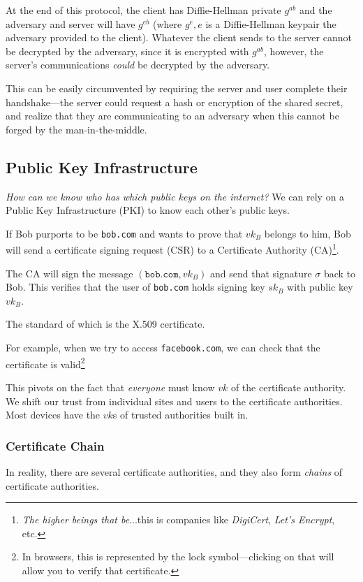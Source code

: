 At the end of this protocol, the client has Diffie-Hellman private $g^{ab}$ and the adversary and server will have $g^{eb}$ (where $g^e, e$ is a Diffie-Hellman keypair the adversary provided to the client). Whatever the client sends to the server cannot be decrypted by the adversary, since it is encrypted with $g^{ab}$, however, the server's communications \emph{could} be decrypted by the adversary.

This can be easily circumvented by requiring the server and user complete their handshake---the server could request a hash or encryption of the shared secret, and realize that they are communicating to an adversary when this cannot be forged by the man-in-the-middle.

\subsection{Public Key Infrastructure}

\emph{How can we know who has which public keys on the internet?} We can rely on a Public Key Infrastructure (PKI) to know each other's public keys.

If Bob purports to be \texttt{bob.com} and wants to prove that $vk_B$ belongs to him, Bob will send a certificate signing request (CSR) to a Certificate Authority (CA)\footnote{\emph{The higher beings that be}...this is companies like \emph{DigiCert}, \emph{Let's Encrypt}, etc.}.

The CA will sign the message $(\mathtt{bob.com}, vk_B)$ and send that signature $\sigma$ back to Bob. This verifies that the user of \texttt{bob.com} holds signing key $sk_B$ with public key $vk_B$.


The standard of which is the X.509 certificate.

For example, when we try to access \texttt{facebook.com}, we can check that the certificate is valid\footnote{In browsers, this is represented by the lock symbol---clicking on that will allow you to verify that certificate.}


This pivots on the fact that \emph{everyone} must know $vk$ of the certificate authority. We shift our trust from individual sites and users to the certificate authorities. Most devices have the $vk$s of trusted authorities built in.

\subsubsection{Certificate Chain}
In reality, there are several certificate authorities, and they also form \emph{chains} of certificate authorities.

